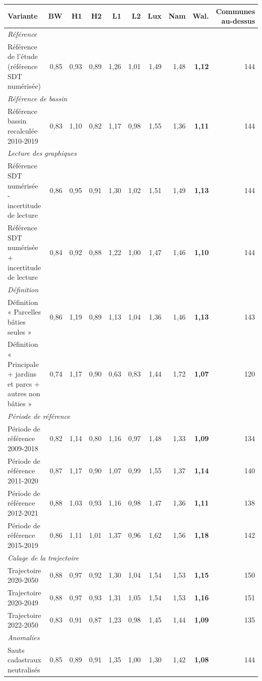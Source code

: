 \begin{tabular}{p{5.6cm}rrrrrrrrr}
\toprule
Variante & BW & H1 & H2 & L1 & L2 & Lux & Nam & Wal. & \makecell{Communes\\au-dessus} \\
\midrule
\multicolumn{10}{l}{\emph{Référence}} \\
\quad Référence de l'étude (référence SDT numérisée) & 0{,}85 & 0{,}93 & 0{,}89 & 1{,}26 & 1{,}01 & 1{,}49 & 1{,}48 & \textbf{1{,}12} & 144 \\
\multicolumn{10}{l}{\emph{Référence de bassin}} \\
\quad Référence bassin recalculée 2010-2019 & 0{,}83 & 1{,}10 & 0{,}82 & 1{,}17 & 0{,}98 & 1{,}55 & 1{,}36 & \textbf{1{,}11} & 144 \\
\multicolumn{10}{l}{\emph{Lecture des graphiques}} \\
\quad Référence SDT numérisée - incertitude de lecture & 0{,}86 & 0{,}95 & 0{,}91 & 1{,}30 & 1{,}02 & 1{,}51 & 1{,}49 & \textbf{1{,}13} & 144 \\
\quad Référence SDT numérisée + incertitude de lecture & 0{,}84 & 0{,}92 & 0{,}88 & 1{,}22 & 1{,}00 & 1{,}47 & 1{,}46 & \textbf{1{,}10} & 144 \\
\multicolumn{10}{l}{\emph{Définition}} \\
\quad Définition « Parcelles bâties seules » & 0{,}86 & 1{,}19 & 0{,}89 & 1{,}13 & 1{,}04 & 1{,}36 & 1{,}46 & \textbf{1{,}13} & 143 \\
\quad Définition « Principale + jardins et parcs + autres non bâties » & 0{,}74 & 1{,}17 & 0{,}90 & 0{,}63 & 0{,}83 & 1{,}44 & 1{,}72 & \textbf{1{,}07} & 120 \\
\multicolumn{10}{l}{\emph{Période de référence}} \\
\quad Période de référence 2009-2018 & 0{,}82 & 1{,}14 & 0{,}80 & 1{,}16 & 0{,}97 & 1{,}48 & 1{,}33 & \textbf{1{,}09} & 134 \\
\quad Période de référence 2011-2020 & 0{,}87 & 1{,}17 & 0{,}90 & 1{,}07 & 0{,}99 & 1{,}55 & 1{,}37 & \textbf{1{,}14} & 140 \\
\quad Période de référence 2012-2021 & 0{,}88 & 1{,}03 & 0{,}93 & 1{,}16 & 0{,}98 & 1{,}47 & 1{,}36 & \textbf{1{,}11} & 138 \\
\quad Période de référence 2015-2019 & 0{,}86 & 1{,}11 & 1{,}01 & 1{,}37 & 0{,}96 & 1{,}62 & 1{,}56 & \textbf{1{,}18} & 142 \\
\multicolumn{10}{l}{\emph{Calage de la trajectoire}} \\
\quad Trajectoire 2020-2050 & 0{,}88 & 0{,}97 & 0{,}92 & 1{,}30 & 1{,}04 & 1{,}54 & 1{,}53 & \textbf{1{,}15} & 150 \\
\quad Trajectoire 2020-2049 & 0{,}88 & 0{,}97 & 0{,}93 & 1{,}31 & 1{,}05 & 1{,}54 & 1{,}53 & \textbf{1{,}16} & 151 \\
\quad Trajectoire 2022-2050 & 0{,}83 & 0{,}91 & 0{,}87 & 1{,}23 & 0{,}98 & 1{,}45 & 1{,}44 & \textbf{1{,}09} & 135 \\
\multicolumn{10}{l}{\emph{Anomalies}} \\
\quad Sauts cadastraux neutralisés & 0{,}85 & 0{,}89 & 0{,}91 & 1{,}35 & 1{,}00 & 1{,}30 & 1{,}42 & \textbf{1{,}08} & 144 \\
\bottomrule
\end{tabular}
